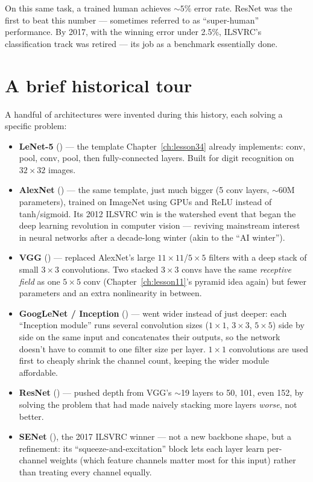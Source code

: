 On this same task, a trained human achieves $\sim5\%$ error rate. ResNet was the first to beat this number --- sometimes referred to as ``super-human'' performance. By 2017, with the winning error under 2.5\%, ILSVRC's classification track was retired --- its job as a benchmark essentially done.

\section{A brief historical tour}

A handful of architectures were invented during this history, each solving a specific problem:
\begin{itemize}
  \item \textbf{LeNet-5} () --- the template Chapter~\ref{ch:lesson34} already implements: conv, pool, conv, pool, then fully-connected layers. Built for digit recognition on $32\times32$ images.
  \item \textbf{AlexNet} () --- the same template, just much bigger (5 conv layers, $\sim$60M parameters), trained on ImageNet using GPUs and ReLU instead of tanh/sigmoid. Its 2012 ILSVRC win is the watershed event that began the deep learning revolution in computer vision --- reviving mainstream interest in neural networks after a decade-long winter (akin to the ``AI winter'').
  \item \textbf{VGG} () --- replaced AlexNet's large $11\times11$/$5\times5$ filters with a deep stack of small $3\times3$ convolutions. Two stacked $3\times3$ convs have the same \emph{receptive field} as one $5\times5$ conv (Chapter~\ref{ch:lesson11}'s pyramid idea again) but fewer parameters and an extra nonlinearity in between.
  \item \textbf{GoogLeNet / Inception} () --- went wider instead of just deeper: each ``Inception module'' runs several convolution sizes ($1\times1$, $3\times3$, $5\times5$) side by side on the same input and concatenates their outputs, so the network doesn't have to commit to one filter size per layer. $1\times1$ convolutions are used first to cheaply shrink the channel count, keeping the wider module affordable.
  \item \textbf{ResNet} () --- pushed depth from VGG's $\sim$19 layers to 50, 101, even 152, by solving the problem that had made naively stacking more layers \emph{worse}, not better.
  \item \textbf{SENet} (), the 2017 ILSVRC winner --- not a new backbone shape, but a refinement: its ``squeeze-and-excitation'' block lets each layer learn per-channel weights (which feature channels matter most for this input) rather than treating every channel equally.
\end{itemize}

